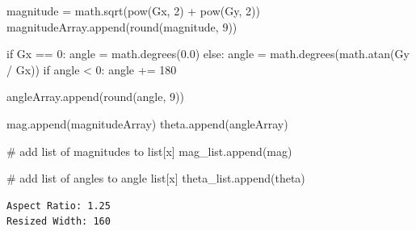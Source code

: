 \documentclass[
  letterpaper,
  DIV=11,
  numbers=noendperiod]{scrreprt}
\newenvironment{Shaded}{\begin{snugshade}}{\end{snugshade}}
\newcommand{\BuiltInTok}[1]{\textcolor[rgb]{0.00,0.23,0.31}{#1}}
\newcommand{\CommentTok}[1]{\textcolor[rgb]{0.37,0.37,0.37}{#1}}
\newcommand{\ControlFlowTok}[1]{\textcolor[rgb]{0.00,0.23,0.31}{#1}}
\newcommand{\DecValTok}[1]{\textcolor[rgb]{0.68,0.00,0.00}{#1}}
\newcommand{\FloatTok}[1]{\textcolor[rgb]{0.68,0.00,0.00}{#1}}
\newcommand{\NormalTok}[1]{\textcolor[rgb]{0.00,0.23,0.31}{#1}}
\newcommand{\OperatorTok}[1]{\textcolor[rgb]{0.37,0.37,0.37}{#1}}
\begin{document}
\begin{Shaded}
\begin{Highlighting}[]
\NormalTok{            magnitude }\OperatorTok{=}\NormalTok{ math.sqrt(}\BuiltInTok{pow}\NormalTok{(Gx, }\DecValTok{2}\NormalTok{) }\OperatorTok{+} \BuiltInTok{pow}\NormalTok{(Gy, }\DecValTok{2}\NormalTok{))}
\NormalTok{            magnitudeArray.append(}\BuiltInTok{round}\NormalTok{(magnitude, }\DecValTok{9}\NormalTok{))}

            \ControlFlowTok{if}\NormalTok{ Gx }\OperatorTok{==} \DecValTok{0}\NormalTok{:}
\NormalTok{                angle }\OperatorTok{=}\NormalTok{ math.degrees(}\FloatTok{0.0}\NormalTok{)}
            \ControlFlowTok{else}\NormalTok{:}
\NormalTok{                angle }\OperatorTok{=}\NormalTok{ math.degrees(math.atan(Gy }\OperatorTok{/}\NormalTok{ Gx))}
                \ControlFlowTok{if}\NormalTok{ angle }\OperatorTok{\textless{}} \DecValTok{0}\NormalTok{:}
\NormalTok{                    angle }\OperatorTok{+=} \DecValTok{180}

\NormalTok{            angleArray.append(}\BuiltInTok{round}\NormalTok{(angle, }\DecValTok{9}\NormalTok{))}

\NormalTok{        mag.append(magnitudeArray)}
\NormalTok{        theta.append(angleArray)}

    \CommentTok{\# add list of magnitudes to list[x]}
\NormalTok{    mag\_list.append(mag)}

    \CommentTok{\# add list of angles to angle list[x]}
\NormalTok{    theta\_list.append(theta)}
\end{Highlighting}
\end{Shaded}

\begin{verbatim}
Aspect Ratio: 1.25
Resized Width: 160
\end{verbatim}
\end{document}
